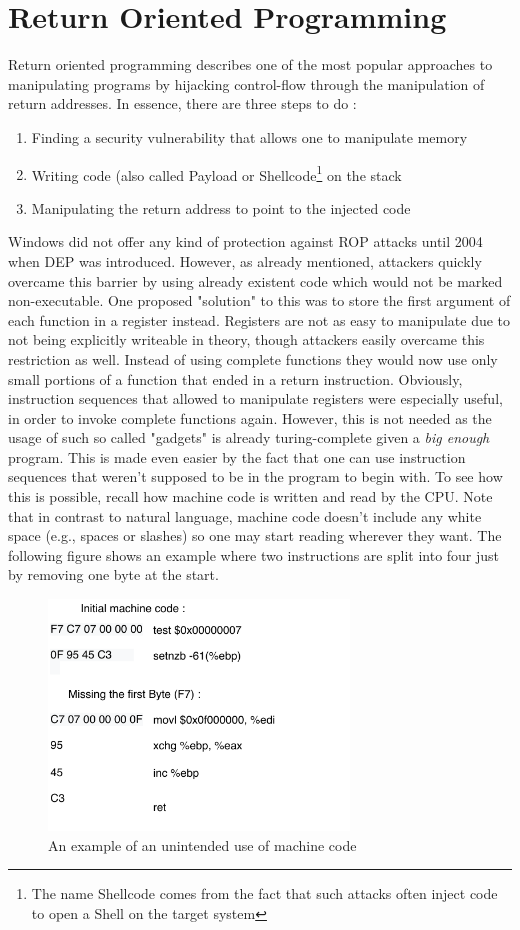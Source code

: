 \documentclass[10pt,twocolumn,a4paper]{article}
\begin{document}
\section{Return Oriented Programming}\label{ROP}
Return oriented programming describes one of the most popular approaches to manipulating programs by hijacking control-flow through the manipulation of return addresses.
In essence, there are three steps to do :
\begin{enumerate}
	\item Finding a security vulnerability that allows one to manipulate memory
	\item Writing code (also called Payload or Shellcode\footnote{The name Shellcode comes from the fact that such attacks often inject code to open a Shell on the target system} on the stack 
	\item Manipulating the return address to point to the injected code
\end{enumerate}
Windows did not offer any kind of protection against ROP attacks until 2004 when DEP was introduced.
However, as already mentioned, attackers quickly overcame this barrier by using already existent code which would not be marked non-executable.
One proposed "solution" to this was to store the first argument of each function in a register instead. Registers are not as easy to manipulate due to not being explicitly writeable in theory, though attackers easily overcame this restriction as well.
Instead of using complete functions they would now use only small portions of a function that ended in a return instruction. Obviously, instruction sequences that allowed to manipulate registers were especially useful, in order to invoke complete functions again.
However, this is not needed as the usage of such so called "gadgets" is already turing-complete given a \emph{big enough}\cite{gadgets} program.
This is made even easier by the fact that one can use instruction sequences that weren't supposed to be in the program to begin with.
To see how this is possible, recall how machine code is written and read by the CPU.
Note that in contrast to natural language, machine code doesn't include any white space (e.g., spaces or slashes) so one may start reading wherever they want.
The following figure shows an example where two instructions are split into four just by removing one byte at the start.
\begin{figure}[h]
  \includegraphics[keepaspectratio,width=8cm]{fig/ByteCode}
  \caption{An example of an unintended use of machine code \cite{geometry}}
\end{figure}
\end{document}
